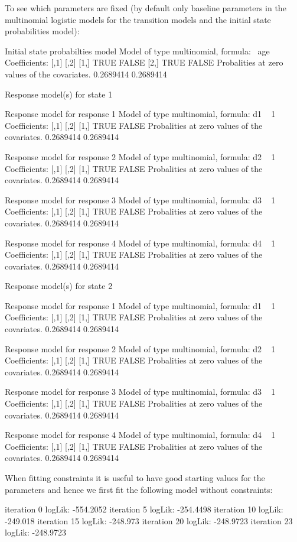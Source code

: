 \documentclass[article]{jss}
\begin{document}
To see which parameters are fixed (by default only baseline parameters
in the multinomial logistic models for the transition models and the
initial state probabilities model):
\begin{Schunk}
\begin{Soutput}
Initial state probabilties model 
Model of type multinomial, formula: ~age
Coefficients: 
     [,1]  [,2]
[1,] TRUE FALSE
[2,] TRUE FALSE
Probalities at zero values of the covariates.
0.2689414 0.2689414 

Response model(s) for state 1 

Response model for response 1 
Model of type multinomial, formula: d1 ~ 1
Coefficients: 
     [,1]  [,2]
[1,] TRUE FALSE
Probalities at zero values of the covariates.
0.2689414 0.2689414 

Response model for response 2 
Model of type multinomial, formula: d2 ~ 1
Coefficients: 
     [,1]  [,2]
[1,] TRUE FALSE
Probalities at zero values of the covariates.
0.2689414 0.2689414 

Response model for response 3 
Model of type multinomial, formula: d3 ~ 1
Coefficients: 
     [,1]  [,2]
[1,] TRUE FALSE
Probalities at zero values of the covariates.
0.2689414 0.2689414 

Response model for response 4 
Model of type multinomial, formula: d4 ~ 1
Coefficients: 
     [,1]  [,2]
[1,] TRUE FALSE
Probalities at zero values of the covariates.
0.2689414 0.2689414 


Response model(s) for state 2 

Response model for response 1 
Model of type multinomial, formula: d1 ~ 1
Coefficients: 
     [,1]  [,2]
[1,] TRUE FALSE
Probalities at zero values of the covariates.
0.2689414 0.2689414 

Response model for response 2 
Model of type multinomial, formula: d2 ~ 1
Coefficients: 
     [,1]  [,2]
[1,] TRUE FALSE
Probalities at zero values of the covariates.
0.2689414 0.2689414 

Response model for response 3 
Model of type multinomial, formula: d3 ~ 1
Coefficients: 
     [,1]  [,2]
[1,] TRUE FALSE
Probalities at zero values of the covariates.
0.2689414 0.2689414 

Response model for response 4 
Model of type multinomial, formula: d4 ~ 1
Coefficients: 
     [,1]  [,2]
[1,] TRUE FALSE
Probalities at zero values of the covariates.
0.2689414 0.2689414 
\end{Soutput}
\end{Schunk}
When fitting constraints it is useful to have good starting values 
for the parameters and hence we first fit the following model without
constraints:
\begin{Schunk}
\begin{Soutput}
iteration 0 logLik: -554.2052 
iteration 5 logLik: -254.4498 
iteration 10 logLik: -249.018 
iteration 15 logLik: -248.973 
iteration 20 logLik: -248.9723 
iteration 23 logLik: -248.9723 
\end{Soutput}
\end{Schunk}
\end{document}
